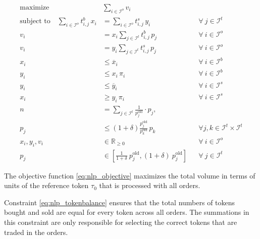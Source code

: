 \documentclass[11pt,parskip=full]{scrartcl}%
\newcommand*{\itokens}{\mathcal{I}^t}       %
\newcommand*{\iorders}{\mathcal{I}^o}       %
\newcommand*{\ibuyorders}{\mathcal{I}^b}    %
\newcommand*{\isellorders}{\mathcal{I}^s}   %
\begin{document}
\begin{subequations}
\begin{align}
  \text{maximize} \quad & \sum\limits_{i \in \iorders} v_i
  \label{eq:nlp_objective}
  \\[4mm]
  \text{subject to} \quad
  \sum\limits_{i \in \iorders} t^b_{i,j} \, x_i
  &= \sum\limits_{i \in \iorders} t^s_{i,j} \, y_i
  && \forall \> j \in \itokens
  \label{eq:nlp_tokenbalance}
  \\[4mm]
  v_i
  &= x_i \sum\limits_{j \in \itokens} t^b_{i,j} \, p_j
  && \forall \> i \in \iorders
  \label{eq:nlp_buyvolume}
  \\[2mm]
  v_i
  &= y_i \sum\limits_{j \in \itokens} t^s_{i,j} \, p_j
  && \forall \> i \in \iorders
  \label{eq:nlp_sellvolume}
  \\[4mm]
  x_i &\le \overline{x}_i
  && \forall \> i \in \ibuyorders
  \label{eq:nlp_tokenamount_1}
  \\[1mm]
  y_i &\le x_i \, \pi_i
  && \forall \> i \in \ibuyorders
  \label{eq:nlp_tokenamount_2}
  \\[4mm]
  y_i &\le \overline{y}_i
  && \forall \> i \in \isellorders
  \label{eq:nlp_tokenamount_3}
  \\[1mm]
  x_i &\ge y_i \, \pi_i
  && \forall \> i \in \isellorders
  \label{eq:nlp_tokenamount_4}
  \\[4mm]
  n
  &= \sum\limits_{j \in \itokens} \frac{1}{p^\mathrm{old}_j} \cdot p_j,
  \label{eq:nlp_reftoken}
  \\[2mm]
  p_j
  &\le \left(1+\delta\right) \frac{p^\mathrm{old}_j}{p^\mathrm{old}_k} \, p_k
  && \forall j,k \in \itokens \times \itokens
  \label{eq:nlp_maxfluct}
  \\[4mm]
  x_i, y_i, v_i &\in \mathbb{R}_{\ge 0}
  && \forall \> i \in \iorders
  \\[2mm]
  p_j
  &\in \left[ \frac{1} {1+\delta} \> p^\mathrm{old}_j, (1+\delta) \> p^\mathrm{old}_j \right]
  && \forall \> j \in \itokens
\end{align}
\label{eq:nlp}
\end{subequations}

The objective function \eqref{eq:nlp_objective} maximizes the total volume in terms of units of
the reference token $ \tau_0 $ that is processed with all orders.

Constraint \eqref{eq:nlp_tokenbalance} ensures that the total numbers of tokens bought and sold are
equal for every token across all orders.
The summations in this constraint are only responsible for selecting the correct tokens that are
traded in the orders.
\end{document}
